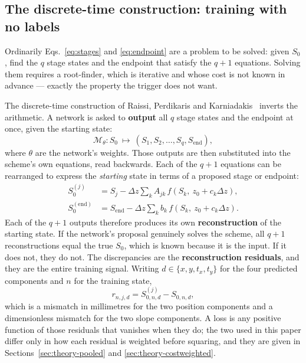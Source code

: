 \documentclass[11pt,a4paper]{article}
\begin{document}
\subsection{The discrete-time construction: training with no labels}
\label{sec:theory-discrete}

Ordinarily Eqs.~\eqref{eq:stages} and \eqref{eq:endpoint} are a problem to be
solved: given $S_0$, find the $q$ stage states and the endpoint that satisfy
the $q + 1$ equations. Solving them requires a root-finder, which is iterative
and whose cost is not known in advance --- exactly the property the trigger
does not want.

The discrete-time construction of Raissi, Perdikaris and
Karniadakis~\citep[\S3]{raissi2019} inverts the arithmetic. A network is asked
to \textbf{output} all $q$ stage states and the endpoint at once, given the
starting state:
%
\begin{equation}
  \mathcal{M}_\theta : S_0 \ \longmapsto\
  \left(S_1, S_2, \dots, S_q, S_{\mathrm{end}}\right),
  \label{eq:net}
\end{equation}
%
where $\theta$ are the network's weights. Those outputs are then substituted
into the scheme's own equations, read backwards. Each of the $q + 1$ equations
can be rearranged to express the \emph{starting} state in terms of a proposed
stage or endpoint:
%
\begin{align}
  S_0^{(j)} &= S_j - \Delta z \sum_{k} A_{jk}\,
                f\!\left(S_k,\ z_0 + c_k \Delta z\right),
  \label{eq:recon-stage}\\
  S_0^{(\mathrm{end})} &= S_{\mathrm{end}} - \Delta z \sum_{k} b_k\,
                f\!\left(S_k,\ z_0 + c_k \Delta z\right).
  \label{eq:recon-end}
\end{align}
%
Each of the $q+1$ outputs therefore produces its own \textbf{reconstruction} of
the starting state. If the network's proposal genuinely solves the scheme, all
$q + 1$ reconstructions equal the true $S_0$, which is known because it is the
input. If it does not, they do not. The discrepancies are the
\textbf{reconstruction residuals}, and they are the entire training signal.
Writing $d \in \{x, y, t_x, t_y\}$ for the four predicted components and $n$
for the training state,
%
\begin{equation}
  r_{n,j,d} = S_{0,n,d}^{(j)} - S_{0,n,d},
  \label{eq:resid}
\end{equation}
%
which is a mismatch in millimetres for the two position components and a
dimensionless mismatch for the two slope components. A loss is any positive
function of those residuals that vanishes when they do; the two used in this
paper differ only in how each residual is weighted before squaring, and they
are given in Sections~\ref{sec:theory-pooled} and \ref{sec:theory-costweighted}.
\end{document}

